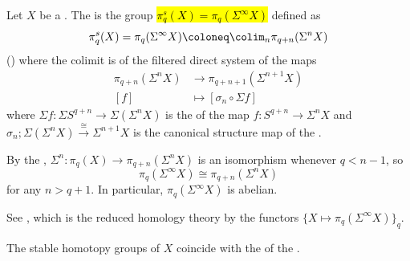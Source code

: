\begin{definition} \label{definition:stable_homotopy_groups_of_a_pointed_topological_space}
    Let $X$ be a . 
    The  is the group \hl{$\pi_q^s(X) = \pi_q(\Sigma^\infty X)$} defined as 
    $$\pi_q^s(X) = \pi_q(\Sigma^\infty X) \coloneq \colim_{n} \pi_{q+n}(\Sigma^n X)$$
    ()
    where the colimit is of the filtered direct system of the maps 
    \begin{align*}
    \pi_{q+n} (\Sigma^n X) &\to \pi_{q+n+1}(\Sigma^{n+1} X) \\
    [f] &\mapsto [\sigma_n \circ \Sigma f]
    \end{align*}
    where $\Sigma f: \Sigma S^{q+n} \to \Sigma(\Sigma^n X)$ is the  of the map $f: S^{q+n} \to \Sigma^n X$ and $\sigma_n; \Sigma(\Sigma^n X) \xrightarrow{\cong} \Sigma^{n+1} X$ is the canonical structure map of the .

    By the , $\Sigma^n: \pi_q(X) \to \pi_{q+n}(\Sigma^n X)$ is an isomorphism whenever $q < n-1$, so 
    $$\pi_q(\Sigma^\infty X) \cong \pi_{q+n}(\Sigma^n X)$$
    for any $n > q+1$. In particular, $\pi_q(\Sigma^\infty X)$ is abelian. 

    See , which is the reduced homology theory   by the functors $\{X \mapsto \pi_q(\Sigma^\infty X)\}_{q}$.

    The stable homotopy groups of $X$ coincide with the  of the . 
\end{definition}